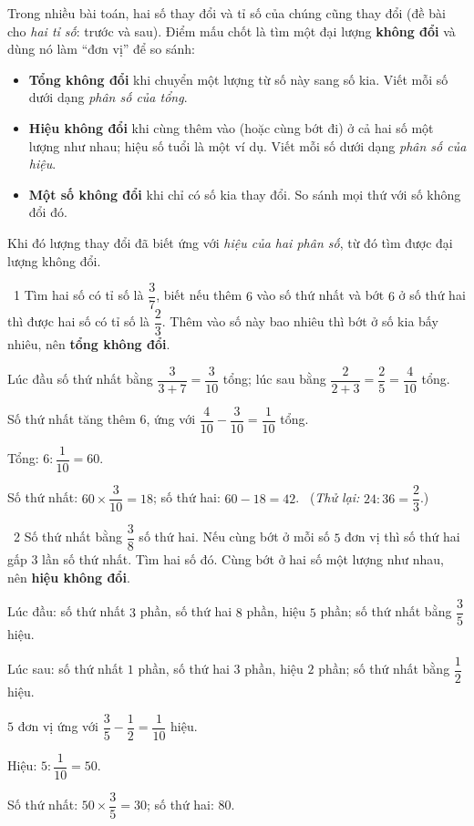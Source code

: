 \begin{knowbox}
Trong nhiều bài toán, hai số thay đổi và tỉ số của chúng cũng thay đổi (đề bài cho \emph{hai tỉ số}: trước và sau). Điểm mấu chốt là tìm một đại lượng \textbf{không đổi} và dùng nó làm ``đơn vị'' để so sánh:
\begin{itemize}[leftmargin=1.4em,itemsep=3pt]
\item \textbf{Tổng không đổi} khi chuyển một lượng từ số này sang số kia. Viết mỗi số dưới dạng \emph{phân số của tổng}.
\item \textbf{Hiệu không đổi} khi cùng thêm vào (hoặc cùng bớt đi) ở cả hai số một lượng như nhau; hiệu số tuổi là một ví dụ. Viết mỗi số dưới dạng \emph{phân số của hiệu}.
\item \textbf{Một số không đổi} khi chỉ có số kia thay đổi. So sánh mọi thứ với số không đổi đó.
\end{itemize}
Khi đó lượng thay đổi đã biết ứng với \emph{hiệu của hai phân số}, từ đó tìm được đại lượng không đổi.
\end{knowbox}
\gap
\begin{exbox}{\ExWord\ 1}
Tìm hai số có tỉ số là $\dfrac37$, biết nếu thêm $6$ vào số thứ nhất và bớt $6$ ở số thứ hai thì được hai số có tỉ số là $\dfrac23$.
\guide
Thêm vào số này bao nhiêu thì bớt ở số kia bấy nhiêu, nên \textbf{tổng không đổi}.\par
Lúc đầu số thứ nhất bằng $\dfrac3{3+7}=\dfrac3{10}$ tổng; lúc sau bằng $\dfrac2{2+3}=\dfrac25=\dfrac4{10}$ tổng.\par
Số thứ nhất tăng thêm $6$, ứng với $\dfrac4{10}-\dfrac3{10}=\dfrac1{10}$ tổng.\par Tổng: $6:\dfrac1{10}=60$.\par
Số thứ nhất: $60\times\dfrac3{10}=18$; số thứ hai: $60-18=42$. \ (\emph{Thử lại:} $24:36=\dfrac23$.)
\end{exbox}
\gap
\begin{exbox}{\ExWord\ 2}
Số thứ nhất bằng $\dfrac38$ số thứ hai. Nếu cùng bớt ở mỗi số $5$ đơn vị thì số thứ hai gấp $3$ lần số thứ nhất. Tìm hai số đó.
\guide
Cùng bớt ở hai số một lượng như nhau, nên \textbf{hiệu không đổi}.\par
Lúc đầu: số thứ nhất $3$ phần, số thứ hai $8$ phần, hiệu $5$ phần; số thứ nhất bằng $\dfrac35$ hiệu.\par
Lúc sau: số thứ nhất $1$ phần, số thứ hai $3$ phần, hiệu $2$ phần; số thứ nhất bằng $\dfrac12$ hiệu.\par
$5$ đơn vị ứng với $\dfrac35-\dfrac12=\dfrac1{10}$ hiệu.\par Hiệu: $5:\dfrac1{10}=50$.\par Số thứ nhất: $50\times\dfrac35=30$; số thứ hai: $80$.
\end{exbox}
